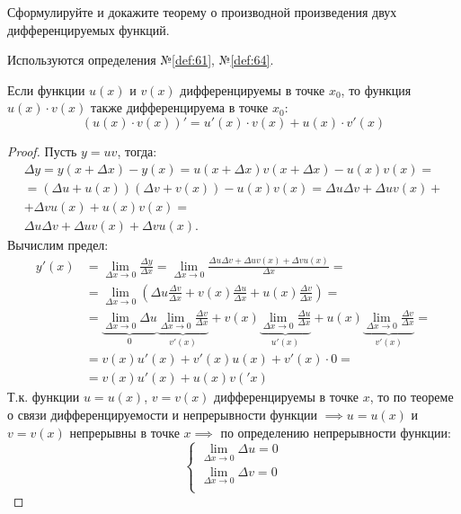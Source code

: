 \begin{question}
    Сформулируйте и докажите теорему о производной произведения двух дифференцируемых функций.
\end{question}
\begin{used}
    Используются определения №\ref{def:61}, №\ref{def:64}.
\end{used}
\begin{theorem}
    Если функции $u(x)$ и $v(x)$ дифференцируемы в точке $x_0$, то функция $u(x) \cdot v(x)$ также дифференцируема в точке $x_0$: \[
        (u(x) \cdot v(x))' = u'(x) \cdot v(x) + u(x) \cdot v'(x)
    \]
\end{theorem}
\begin{proof}
    Пусть $y = uv$, тогда:
    \begin{gather*}
        \Delta  y = y(x + \Delta x) - y(x) = u(x + \Delta x) v(x + \Delta x) - u(x) v(x) = \\
        = (\Delta u + u(x))(\Delta v + v(x)) - u(x) v(x) = \Delta u \Delta v + \Delta u v(x) + \\
        + \Delta v u(x) + u(x) v (x) = \\
        \Delta u \Delta v + \Delta u v(x) + \Delta v u(x).
    \end{gather*}
    Вычислим предел:
    \begin{align*}
        y'(x) &= \lim_{\Delta x \to 0} \frac{\Delta y}{\Delta x} 
           = \lim_{\Delta x \to 0}  \frac{ \Delta u \Delta v + \Delta  u v(x) + \Delta v u(x)}{\Delta x} = \\
          &= \lim_{\Delta x \to 0} \left( \Delta u \frac{\Delta v}{\Delta x} + v(x) \frac{\Delta u}{\Delta x} + u(x) \frac{\Delta v}{\Delta x} \right) = \\
          &= \underbrace{\lim_{\Delta x \to 0} \Delta u}_{0} \underbrace{\lim_{\Delta x \to 0} \frac{\Delta v}{\Delta x}}_{v'(x)} + v(x) \underbrace{\lim_{\Delta x \to 0} \frac{\Delta u}{\Delta x}}_{u'(x)} + u(x)\underbrace{\lim_{\Delta x \to 0} \frac{\Delta v}{\Delta x}}_{v'(x)} = \\
          &= v(x) u'(x) + v'(x) u(x) + v'(x) \cdot 0 = \\
          &= \boxed{v(x) u'(x) + u(x) v('x)}
    \end{align*}
    Т.к. функции $u = u(x)$, $v = v(x)$ дифференцируемы в точке $x$, то по теореме о связи дифференцируемости и непрерывности функции  $\implies u = u(x)$ и $v = v(x)$ непрерывны в точке  $x \implies$ по определению непрерывности функции: \[
        \begin{cases}
            \lim_{\Delta x \to 0} \Delta u = 0 \\
            \lim_{\Delta x \to 0} \Delta v = 0 \\
        \end{cases}
    \] 
\end{proof}
\pagebreak



